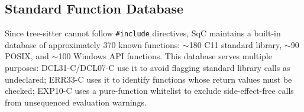 \subsection{Standard Function Database}
\label{sec:stdlib-db}

Since tree-sitter cannot follow \texttt{\#include} directives, SqC
maintains a built-in database of approximately 370 known functions:
$\sim$180 C11 standard library, $\sim$90 POSIX, and $\sim$100 Windows
API functions.  This database serves multiple purposes: DCL31-C/DCL07-C
use it to avoid flagging standard library calls as undeclared; ERR33-C
uses it to identify functions whose return values must be checked;
EXP10-C uses a pure-function whitelist to exclude side-effect-free
calls from unsequenced evaluation warnings.
